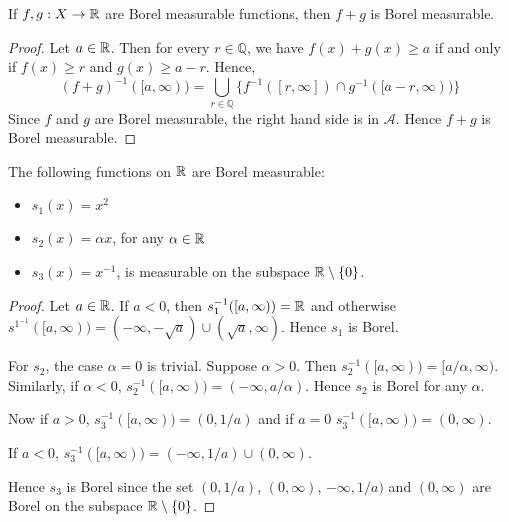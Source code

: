 \documentclass{unswmaths}
\begin{document}
\begin{lemma}
\label{fnsonR}
     If $f,g:X\rightarrow \mathbb{R}$ are Borel measurable functions, then $f+g$ is Borel
     measurable.
\end{lemma}
\begin{proof}
     Let $a \in \mathbb{R}$. Then for every $r \in \mathbb{Q}$, we
     have $f(x) + g(x) \geq a$ if and only if $f(x) \geq r$ and $g(x) \geq a-r$. Hence,
     \begin{equation*}
         (f+g)^{-1}([a,\infty)) = \bigcup_{r \in \mathbb{Q}} \{ f^{-1}([r,\infty])\cap g^{-1}([a-r,\infty))\}
     \end{equation*}
     Since $f$ and $g$ are Borel measurable, the right hand side is in $\mathcal{A}$.
     Hence $f+g$ is Borel measurable.
\end{proof}
\begin{lemma}
    The following functions on $\mathbb{R}$ are Borel measurable:
    \begin{itemize}
        \item{} $s_1(x) = x^2$
        \item{} $s_2(x) = \alpha x$, for any $\alpha \in \mathbb{R}$
        \item{} $s_3(x) = x^{-1}$, is measurable on the subspace $\mathbb{R}\setminus\{0\}$.
    \end{itemize}
\end{lemma}
\begin{proof}
    Let $a \in \mathbb{R}$. If $a < 0$, then $s_1^{-1}([a,\infty)) = \mathbb{R}$ and otherwise $s^1^{-1}([a,\infty)) = (-\infty,-\sqrt{a})\cup(\sqrt{a},\infty)$.
    Hence $s_1$ is Borel.
    
    For $s_2$, the case $\alpha = 0$ is trivial. Suppose $\alpha > 0$. Then $s_2^{-1}([a,\infty)) = [a/\alpha,\infty)$. Similarly,
    if $\alpha < 0$, $s_2^{-1}([a,\infty)) = (-\infty, a/\alpha)$. Hence $s_2$ is Borel for any $\alpha$.
    
    Now if $a > 0$, $s_3^{-1}([a,\infty)) = (0,1/a)$ and if $a = 0$ $s_3^{-1}([a,\infty)) = (0,\infty)$.
    
    If $a < 0$, $s_3^{-1}([a,\infty)) = (-\infty,1/a)\cup (0,\infty)$.
    
    Hence $s_3$ is Borel since the set $(0,1/a)$, $(0,\infty)$, $-\infty,1/a)$ and $(0,\infty)$ are
    Borel on the subspace $\mathbb{R}\setminus \{0\}$.
\end{proof}
\end{document}

